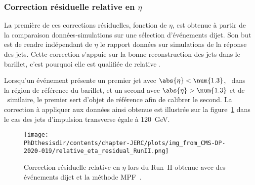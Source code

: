 \subsubsection{Correction résiduelle relative en $\eta$}\label{chapter-JERC-section-CMS-subsec-residuals_eta}
La première de ces corrections résiduelles, fonction de $\eta$, est obtenue à partir de la comparaison données-simulations sur une sélection d'événements dijet.
Son but est de rendre indépendant de $\eta$ le rapport données sur simulations de la réponse des jets.
Cette correction s'appuie sur la bonne reconstruction des jets dans le barillet, c'est pourquoi elle est qualifiée de \og relative \fg.
\par Lorsqu'un événement présente un premier jet avec $\abs{\eta}<\num{1.3}$, \ie\ dans la région de référence du barillet, et un second avec $\abs{\eta}>\num{1.3}$ et de \pT\ similaire, le premier sert d'objet de référence afin de calibrer le second.
La correction à appliquer aux données ainsi obtenue est illustrée sur la figure~\ref{fig-L2ResRel_RunII} dans le cas des jets d'impulsion transverse égale à \SI{120}{\GeV}.
\begin{figure}[h]
\centering
\texttt{[image: \\PhDthesisdir/contents/chapter-JERC/plots/img\_from\_CMS-DP-2020-019/relative\_eta\_residual\_RunII.png]}
\caption[Correction résiduelle relative en $\eta$ lors du Run~II.]{Correction résiduelle relative en $\eta$ lors du Run~II obtenue avec des événements dijet et la méthode MPF~\cite{CMS-DP-2020-019}.}
\label{fig-L2ResRel_RunII}
\end{figure}
